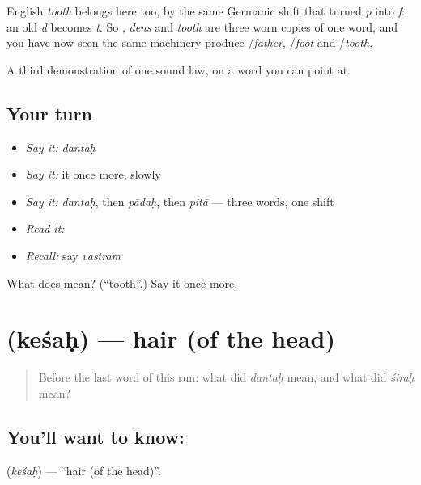 English \emph{tooth} belongs here too, by the same Germanic shift that turned \emph{p} into \emph{f}: an old \emph{d} becomes \emph{t}. So , \emph{dens} and \emph{tooth} are three worn copies of one word, and you have now seen the same machinery produce /\emph{father}, /\emph{foot} and /\emph{tooth}.

\begin{grammarlens}[title={What you've built}]
A third demonstration of one sound law, on a word you can point at.
\end{grammarlens}

\subsection*{Your turn}
\begin{itemize}
\raggedright
  \item \emph{Say it:} \emph{dantaḥ}
  \item \emph{Say it:} it once more, slowly
  \item \emph{Say it:} \emph{dantaḥ}, then \emph{pādaḥ}, then \emph{pitā} — three words, one shift
  \item \emph{Read it:} \textbf{}
  \item \emph{Recall:} say \emph{vastram}
\end{itemize}

\begin{tcolorbox}[breakable,colback=teal!4,colframe=teal!35!black,title={Before you move on}]
What does  mean? (\textquotedblleft{}tooth\textquotedblright{}.) Say it once more.
\end{tcolorbox}
\section[\texorpdfstring{\sk{केशः} (keśaḥ)}{केशः (keśaḥ)}]{ (keśaḥ) — hair (of the head)}

\label{lesson:SA-C25-hair}



\begin{quote}
Before the last word of this run: what did \emph{dantaḥ} mean, and what did \emph{śiraḥ} mean?
\end{quote}

\subsection*{You'll want to know: }
\textbf{} (\emph{keśaḥ}) — \textquotedblleft{}hair (of the head)\textquotedblright{}.

